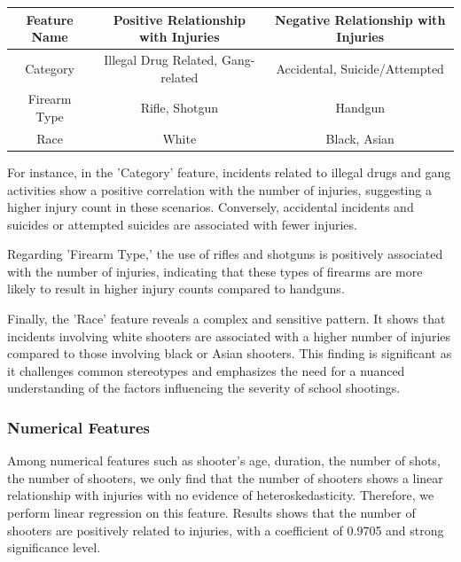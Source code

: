 \documentclass[12pt]{article}
\numberwithin{figure}{section}
\begin{document}
\begin{table}[H]
\begin{tabular}{|c|c|c|}
\hline
Feature Name & Positive Relationship with Injuries & Negative Relationship with Injuries \\ \hline
Category     & Illegal Drug Related, Gang-related  & Accidental, Suicide/Attempted       \\ \hline
Firearm Type & Rifle, Shotgun                      & Handgun                             \\ \hline
Race         & White                               & Black, Asian                        \\ \hline
\end{tabular}
\label{lm_cate_results}
\end{table}

For instance, in the 'Category' feature, incidents related to illegal drugs and gang activities show a positive correlation with the number of injuries, suggesting a higher injury count in these scenarios. Conversely, accidental incidents and suicides or attempted suicides are associated with fewer injuries.

Regarding 'Firearm Type,' the use of rifles and shotguns is positively associated with the number of injuries, indicating that these types of firearms are more likely to result in higher injury counts compared to handguns.

Finally, the 'Race' feature reveals a complex and sensitive pattern. It shows that incidents involving white shooters are associated with a higher number of injuries compared to those involving black or Asian shooters. This finding is significant as it challenges common stereotypes and emphasizes the need for a nuanced understanding of the factors influencing the severity of school shootings.

\subsubsection{Numerical Features}

Among numerical features such as shooter's age, duration, the number of shots, the number of shooters, we only find that the number of shooters shows a linear relationship with injuries with no evidence of heteroskedasticity. Therefore, we perform linear regression on this feature. Results shows that the number of shooters are positively related to injuries, with a coefficient of 0.9705 and strong significance level.
\end{document}
